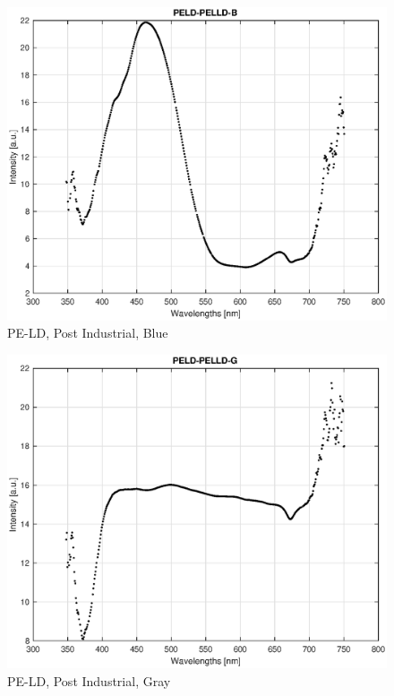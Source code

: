 \begin{appendices}
\begin{figure}
    \centering
    \includegraphics[width = 12cm]{Images/appendix/pe-ld-postindust-blue.eps}
    \caption[$\; \:$PE-LD Post Industrial, Blue]{PE-LD, Post Industrial, Blue}
    \label{fig:peld-blue}
\end{figure}

\begin{figure}
    \centering
    \includegraphics[width = 12cm]{Images/appendix/pe-ld-postindust-gray.eps}
    \caption[$\; \:$PE-LD Post Industrial, Gray]{PE-LD, Post Industrial, Gray}
    \label{fig:peld-gray}
\end{figure}


\end{appendices}
